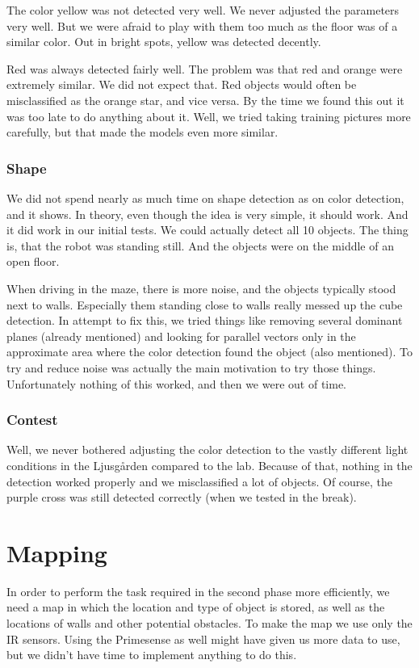 The color yellow was not detected very well. We never adjusted the parameters
very well. But we were afraid to play with them too much as the floor was of a
similar color. Out in bright spots, yellow was detected decently.

Red was always detected fairly well. The problem was that red and orange were
extremely similar. We did not expect that. Red objects would often be
misclassified as the orange star, and vice versa. By the time we found this out
it was too late to do anything about it. Well, we tried taking training pictures
more carefully, but that made the models even more similar.

\subsubsection{Shape}
We did not spend nearly as much time on shape detection as on color detection,
and it shows. In theory, even though the idea is very simple, it should work.
And it did work in our initial tests. We could actually detect all 10 objects.
The thing is, that the robot was standing still. And the objects were on the
middle of an open floor.

When driving in the maze, there is more noise, and the objects typically stood
next to walls. Especially them standing close to walls really messed up the cube
detection. In attempt to fix this, we tried things like removing several
dominant planes (already mentioned) and looking for parallel vectors only in the
approximate area where the color detection found the object (also mentioned). To
try and reduce noise was actually the main motivation to try those things.
Unfortunately nothing of this worked, and then we were out of time.

\subsubsection{Contest}
Well, we never bothered adjusting the color detection to the vastly different
light conditions in the Ljusg{\aa}rden compared to the lab. Because of that, nothing
in the detection worked properly and we misclassified a lot of objects. Of
course, the purple cross was still detected correctly (when we tested in the
break).

\section{Mapping}
In order to perform the task required in the second phase more efficiently, we
need a map in which the location and type of object is stored, as well as the
locations of walls and other potential obstacles. To make the map we use only
the IR sensors. Using the Primesense as well might have given us more data to
use, but we didn't have time to implement anything to do this.
